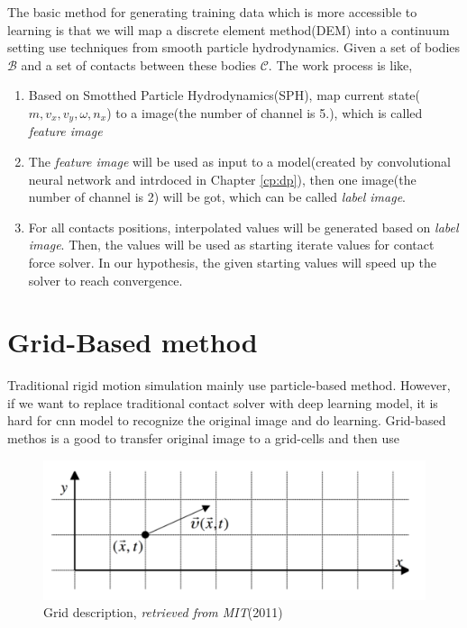     The basic method for generating training data which is more accessible to learning is that we will map a discrete element method(DEM) into a continuum setting use techniques from smooth particle hydrodynamics. Given a set of bodies $\mathcal{B}$ and a set of contacts between these bodies $\mathcal{C}$. The work process is like,
    \begin{enumerate}
        \item Based on Smotthed Particle Hydrodynamics(SPH), map current state($m, v_x, v_y, \omega, n_x$) to a image(the number of channel is 5.), which is called \textit{feature image}
        \item The \textit{feature image} will be used as input to a model(created by convolutional neural network and intrdoced in Chapter \ref{cp:dp}), then one image(the number of channel is 2) will be got, which can be called \textit{label image}.
        \item For all contacts positions, interpolated values will be generated based on \textit{label image}. Then, the values will be used as starting iterate values for contact force solver. In our hypothesis, the given starting values will speed up the solver to reach convergence.
    \end{enumerate}

\section{Grid-Based method}
    Traditional rigid motion simulation mainly use particle-based method. However, if we want to replace traditional contact solver with deep learning model, it is hard for cnn model to recognize the original image and do learning. Grid-based methos is a good to transfer original image to a grid-cells and then use

    \begin{figure}
        \centering
        \includegraphics[scale = 0.4]{Figures/grid_method.png}
        \caption{Grid description, \textit{retrieved from MIT}(2011)}
    \end{figure}

